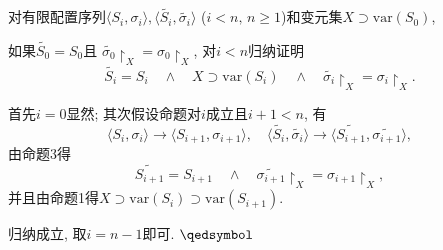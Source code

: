 \documentclass[UTF8]{ctexart}
\begin{document}
\vspace{5pt}

对有限配置序列$\langle S_i,\sigma_i\rangle,
\langle\widetilde{S_i},\widetilde{\sigma_i}\rangle$
($i<n,\,n\geqslant 1$)和变元集$X\supset\mathrm{var}(S_0)$,

如果$\widetilde{S_0}=S_0$且
$\widetilde{\sigma_0}\!\restriction_X=\sigma_0\!\restriction_X$,
对$i<n$归纳证明
\[
    \widetilde{S_i}=S_i\quad\land\quad X\supset\mathrm{var}(S_i)\quad\land\quad
    \widetilde{\sigma_i}\!\restriction_X=\sigma_i\!\restriction_X.
\]

首先$i=0$显然; 其次假设命题对$i$成立且$i+1<n$, 有
\[
    \langle S_i,\sigma_i\rangle\to\langle S_{i+1},\sigma_{i+1}\rangle,\quad
    \langle\widetilde{S_i},\widetilde{\sigma_i}\rangle\to
    \langle\widetilde{S_{i+1}},\widetilde{\sigma_{i+1}}\rangle,
\]
由命题3得
\[
    \widetilde{S_{i+1}}=S_{i+1}\quad\land\quad
    \widetilde{\sigma_{i+1}}\!\restriction_X=\sigma_{i+1}\!\restriction_X,
\]
并且由命题1得$X\supset\mathrm{var}(S_i)\supset\mathrm{var}(S_{i+1})$.

归纳成立, 取$i=n-1$即可. \hfill $\qedsymbol$
\end{document}
